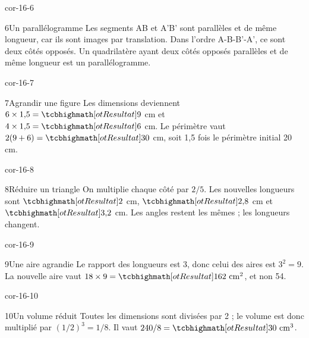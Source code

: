 \begin{blocLivre}{cor-16-6}\begin{corrige}{6}{Un parallélogramme}
Les segments AB et A’B’ sont parallèles et de même longueur, car ils sont images par translation. Dans l’ordre A-B-B’-A’, ce sont deux côtés opposés. Un quadrilatère ayant deux côtés opposés parallèles et de même longueur est un parallélogramme.
\label{fig-cor-16-6}
\end{corrige}\end{blocLivre}
\begin{blocLivre}{cor-16-7}\begin{corrige}{7}{Agrandir une figure}
Les dimensions deviennent $6\times1{,}5=\res9$ cm et $4\times1{,}5=\res6$ cm. Le périmètre vaut $2(9+6)=\res{30}$ cm, soit 1,5 fois le périmètre initial 20 cm.
\label{fig-cor-16-7}
\end{corrige}\end{blocLivre}
\begin{blocLivre}{cor-16-8}\begin{corrige}{8}{Réduire un triangle}
On multiplie chaque côté par $2/5$. Les nouvelles longueurs sont $\res2$ cm, $\res{2{,}8}$ cm et $\res{3{,}2}$ cm. Les angles restent les mêmes ; les longueurs changent.
\label{fig-cor-16-8}
\end{corrige}\end{blocLivre}
\begin{blocLivre}{cor-16-9}\begin{corrige}{9}{Une aire agrandie}
Le rapport des longueurs est 3, donc celui des aires est $3^2=9$. La nouvelle aire vaut $18\times9=\res{162\ \mathrm{cm}^2}$, et non 54.
\label{fig-cor-16-9}
\end{corrige}\end{blocLivre}
\begin{blocLivre}{cor-16-10}\begin{corrige}{10}{Un volume réduit}
Toutes les dimensions sont divisées par 2 ; le volume est donc multiplié par $(1/2)^3=1/8$. Il vaut $240/8=\res{30\ \mathrm{cm}^3}$.
\label{fig-cor-16-10}
\end{corrige}\end{blocLivre}
